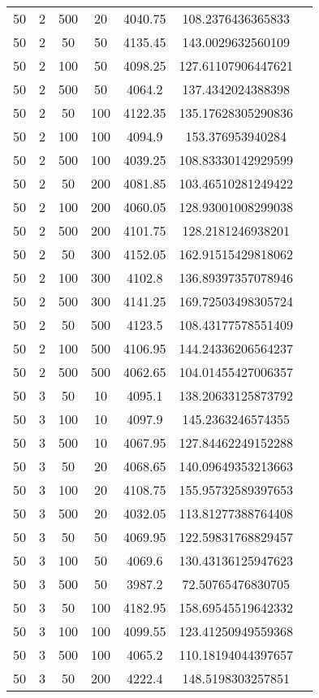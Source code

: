 {\begin{longtabu}{S
S
S
S
S
S[round-mode=places,round-precision=0]
S[round-mode=places,round-precision=0]}
50 & 2 & 500 & 20 & 4040.75 & 108.2376436365833 \\
50 & 2 & 50 & 50 & 4135.45 & 143.0029632560109 \\
50 & 2 & 100 & 50 & 4098.25 & 127.61107906447621 \\
50 & 2 & 500 & 50 & 4064.2 & 137.4342024388398 \\
50 & 2 & 50 & 100 & 4122.35 & 135.17628305290836 \\
50 & 2 & 100 & 100 & 4094.9 & 153.376953940284 \\
50 & 2 & 500 & 100 & 4039.25 & 108.83330142929599 \\
50 & 2 & 50 & 200 & 4081.85 & 103.46510281249422 \\
50 & 2 & 100 & 200 & 4060.05 & 128.93001008299038 \\
50 & 2 & 500 & 200 & 4101.75 & 128.2181246938201 \\
50 & 2 & 50 & 300 & 4152.05 & 162.91515429818062 \\
50 & 2 & 100 & 300 & 4102.8 & 136.89397357078946 \\
50 & 2 & 500 & 300 & 4141.25 & 169.72503498305724 \\
50 & 2 & 50 & 500 & 4123.5 & 108.43177578551409 \\
50 & 2 & 100 & 500 & 4106.95 & 144.24336206564237 \\
50 & 2 & 500 & 500 & 4062.65 & 104.01455427006357 \\
50 & 3 & 50 & 10 & 4095.1 & 138.20633125873792 \\
50 & 3 & 100 & 10 & 4097.9 & 145.2363246574355 \\
50 & 3 & 500 & 10 & 4067.95 & 127.84462249152288 \\
50 & 3 & 50 & 20 & 4068.65 & 140.09649353213663 \\
50 & 3 & 100 & 20 & 4108.75 & 155.95732589397653 \\
50 & 3 & 500 & 20 & 4032.05 & 113.81277388764408 \\
50 & 3 & 50 & 50 & 4069.95 & 122.59831768829457 \\
50 & 3 & 100 & 50 & 4069.6 & 130.43136125947623 \\
50 & 3 & 500 & 50 & 3987.2 & 72.50765476830705 \\
50 & 3 & 50 & 100 & 4182.95 & 158.69545519642332 \\
50 & 3 & 100 & 100 & 4099.55 & 123.41250949559368 \\
50 & 3 & 500 & 100 & 4065.2 & 110.18194044397657 \\
50 & 3 & 50 & 200 & 4222.4 & 148.5198303257851 \\

\end{longtabu}}
